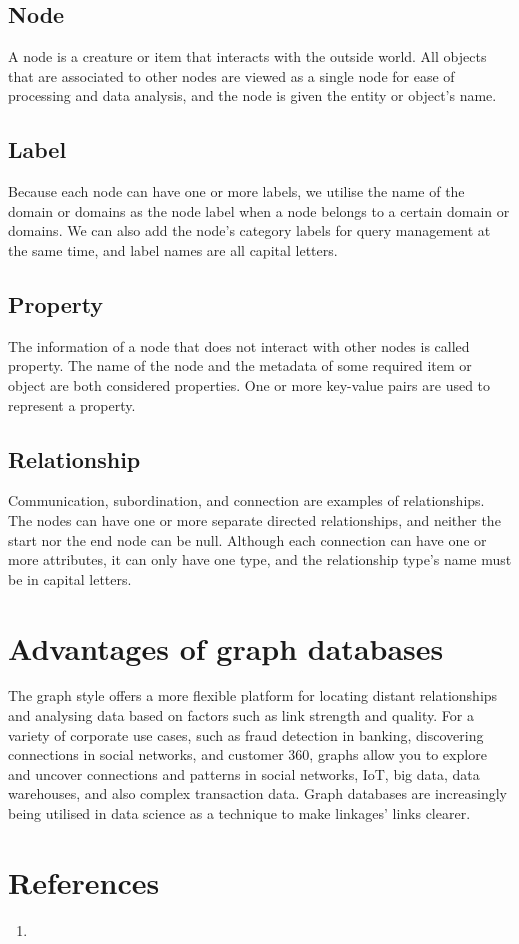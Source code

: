 \documentclass[paper=a4, fontsize=11pt]{scrartcl}
\numberwithin{equation}{section}		%
\numberwithin{figure}{section}			%
\numberwithin{table}{section}				%
\begin{document}
\subsection {Node}
A node is a creature or item that interacts with the outside world. All objects that are associated to other nodes are viewed as a single node for ease of processing and data analysis, and the node is given the entity or object's name.

\subsection {Label}
Because each node can have one or more labels, we utilise the name of the domain or domains as the node label when a node belongs to a certain domain or domains. We can also add the node's category labels for query management at the same time, and label names are all capital letters.

\newpage
\subsection {Property}
The information of a node that does not interact with other nodes is called property. The name of the node and the metadata of some required item or object are both considered properties. One or more key-value pairs are used to represent a property.

\subsection {Relationship}
Communication, subordination, and connection are examples of relationships. The nodes can have one or more separate directed relationships, and neither the start nor the end node can be null. Although each connection can have one or more attributes, it can only have one type, and the relationship type's name must be in capital letters.

\section{Advantages of graph databases}
The graph style offers a more flexible platform for locating distant relationships and analysing data based on factors such as link strength and quality. For a variety of corporate use cases, such as fraud detection in banking, discovering connections in social networks, and customer 360, graphs allow you to explore and uncover connections and patterns in social networks, IoT, big data, data warehouses, and also complex transaction data. Graph databases are increasingly being utilised in data science as a technique to make linkages' links clearer.

\newpage
\section{References}
\begin{enumerate}
    \item 
\end{enumerate}
\end{document}
